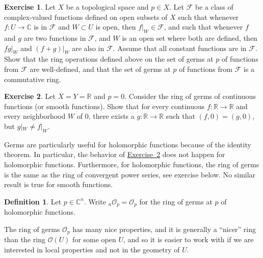 \documentclass[12pt,openany]{book}
\newcommand{\C}{{\mathbb{C}}}
\newcommand{\R}{{\mathbb{R}}}
\newcommand{\sF}{{\mathscr{F}}}
\newcommand{\sO}{{\mathscr{O}}}
\theoremstyle{plain}
\theoremstyle{remark}
\theoremstyle{definition}
\newtheorem{defn}[thm]{Definition}
\newenvironment{exbox}{%
    \def\FrameCommand{\vrule width 1pt \relax\hspace{10pt}}%
    \MakeFramed{\advance\hsize-\width\FrameRestore}%
}{%
    \endMakeFramed
}
\theoremstyle{exercise}
\newtheorem{exercise}{Exercise}[section]
\theoremstyle{example}
\newcommand{\exerciseref}[1]{\hyperref[#1]{Exercise~\ref*{#1}}}
\begin{document}
\begin{exbox}
\begin{exercise}
Let $X$ be a topological space and $p \in X$.
Let $\sF$ be a class of complex-valued functions defined on open subsets
of $X$ such that whenever $f \colon U \to \C$ is in $\sF$ and $W \subset U$ is open,
then $f|_W \in \sF$, and such that whenever $f$ and $g$
are two functions in $\sF$, and $W$ is an open set where both are defined,
then $fg|_W$ and $(f+g)|_W$ are also in $\sF$.
Assume that all constant functions are in $\sF$.
Show that the ring operations defined above
on the set of germs at $p$ of functions from $\sF$ are well-defined,
and that the set of germs at $p$ of functions from $\sF$ is a commutative
ring.
\end{exercise}

\begin{exercise} \label{exercise:contgermsnothausdorff}
Let $X=Y=\R$ and $p=0$.  Consider the ring of germs of
continuous functions (or smooth functions).
Show that for every continuous $f \colon \R \to \R$ and every neighborhood
$W$ of $0$, there exists a $g \colon \R \to \R$
such that $(f,0) = (g,0)$, but $g|_W \neq f|_W$.
\end{exercise}
\end{exbox}

Germs are particularly useful for holomorphic functions because of the identity
theorem.  In particular, the behavior of
\exerciseref{exercise:contgermsnothausdorff} does not happen
for holomorphic functions.  Furthermore, for holomorphic functions, the
ring of germs is the same as the ring of convergent power series, see
exercise below.  No similar result is true for smooth functions.

\begin{defn}
Let $p \in \C^n$.
%
Write
${}_n\sO_p = \sO_p$ for the ring of germs at $p$ of holomorphic functions.
\end{defn}

The ring of germs $\sO_p$ has many nice properties,
and it is generally a ``nicer'' ring than the ring $\sO(U)$ for
some open $U$, and so it is easier to work with if we are interested
in local properties and not in the geometry of $U$.
\end{document}
